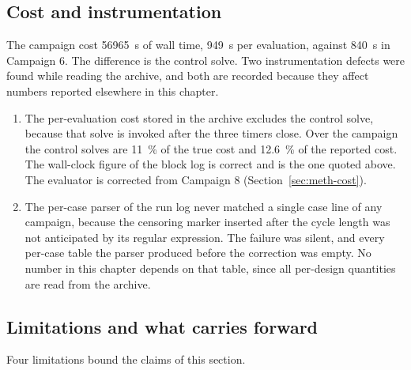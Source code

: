 \subsection{Cost and instrumentation}
\label{sec:res-c7-cost}

The campaign cost \SI{56965}{s} of wall time, \SI{949}{s} per
evaluation, against \SI{840}{s} in Campaign 6. The difference is the
control solve. Two instrumentation defects were found while reading
the archive, and both are recorded because they affect numbers reported
elsewhere in this chapter.

\begin{enumerate}
  \item The per-evaluation cost stored in the archive excludes the
        control solve, because that solve is invoked after the three
        timers close. Over the campaign the control solves are
        \SI{11}{\%} of the true cost and \SI{12.6}{\%} of the reported
        cost. The wall-clock figure of the block log is correct and is
        the one quoted above. The evaluator is corrected from Campaign
        8 (Section~\ref{sec:meth-cost}).

  \item The per-case parser of the run log never matched a single case
        line of any campaign, because the censoring marker inserted
        after the cycle length was not anticipated by its regular
        expression. The failure was silent, and every per-case table
        the parser produced before the correction was empty. No number
        in this chapter depends on that table, since all per-design
        quantities are read from the archive.
\end{enumerate}

\subsection{Limitations and what carries forward}
\label{sec:res-c7-limits}

Four limitations bound the claims of this section.

